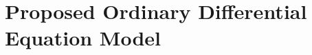 \documentclass{article}
\newcommand{\sitem}[1]
{
    \begin{itemize}
        \item #1
    \end{itemize}
}
\begin{document}
  \section{Proposed Ordinary Differential Equation Model}
\end{document}
